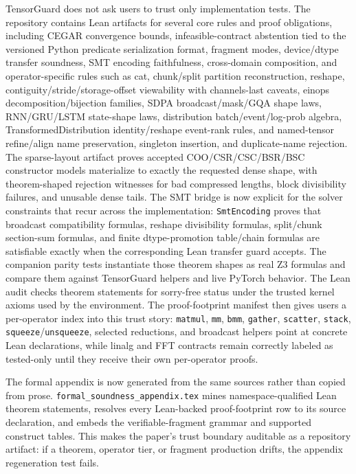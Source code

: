 \documentclass[11pt]{article}
\newcommand{\tg}{TensorGuard}
\begin{document}
\tg{} does not ask users to trust only implementation tests.  The repository
contains Lean artifacts for several core rules and proof obligations, including
CEGAR convergence bounds, infeasible-contract abstention tied to the versioned
Python predicate serialization format, fragment modes, device/dtype transfer
soundness, SMT encoding faithfulness, cross-domain
composition, and operator-specific rules such as cat, chunk/split partition
reconstruction, reshape, contiguity/stride/storage-offset viewability with
channels-last caveats, einops decomposition/bijection families, SDPA
broadcast/mask/GQA shape laws, RNN/GRU/LSTM state-shape laws,
distribution batch/event/log-prob algebra,
TransformedDistribution identity/reshape event-rank rules, and named-tensor
refine/align name preservation, singleton insertion, and duplicate-name
rejection.  The sparse-layout artifact proves accepted COO/CSR/CSC/BSR/BSC
constructor models materialize to exactly the requested dense shape, with
theorem-shaped rejection witnesses for bad compressed lengths, block
divisibility failures, and unusable dense tails.
The SMT bridge is now explicit for the solver constraints that recur across the
implementation: \texttt{SmtEncoding} proves that broadcast compatibility
formulas, reshape divisibility formulas, split/chunk section-sum formulas, and
finite dtype-promotion table/chain formulas are satisfiable exactly when the
corresponding Lean transfer guard accepts.  The companion parity tests instantiate
those theorem shapes as real Z3 formulas and compare them against \tg{} helpers
and live PyTorch behavior.
The Lean audit checks theorem statements for sorry-free status under the
trusted kernel axioms used by the environment.  The proof-footprint manifest
then gives users a per-operator index into this trust story: \texttt{matmul},
\texttt{mm}, \texttt{bmm}, \texttt{gather}, \texttt{scatter},
\texttt{stack}, \texttt{squeeze}/\texttt{unsqueeze}, selected reductions, and
broadcast helpers point at concrete Lean declarations, while linalg and FFT
contracts remain correctly labeled as tested-only until they receive their own
per-operator proofs.

The formal appendix is now generated from the same sources rather than copied
from prose.  \texttt{formal\_soundness\_appendix.tex} mines namespace-qualified
Lean theorem statements, resolves every Lean-backed proof-footprint row to its
source declaration, and embeds the verifiable-fragment grammar and supported
construct tables.  This makes the paper's trust boundary auditable as a
repository artifact: if a theorem, operator tier, or fragment production drifts,
the appendix regeneration test fails.
\end{document}
